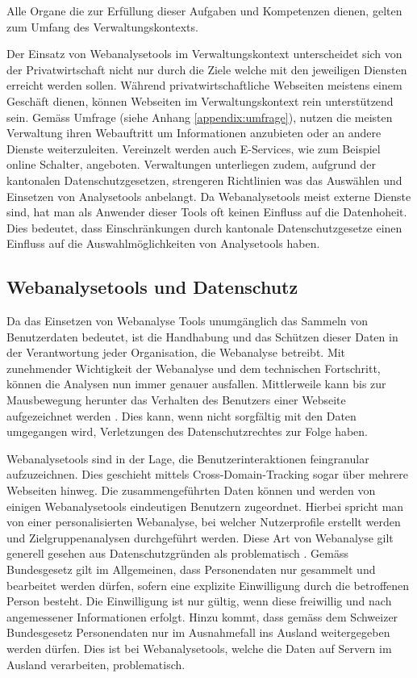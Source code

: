 Alle Organe die zur Erfüllung dieser Aufgaben und Kompetenzen dienen, gelten zum Umfang des Verwaltungskontexts.

Der Einsatz von Webanalysetools im Verwaltungskontext unterscheidet sich von der Privatwirtschaft nicht nur durch die Ziele welche mit den jeweiligen Diensten erreicht werden sollen. Während privatwirtschaftliche Webseiten meistens einem Geschäft dienen, können Webseiten im Verwaltungskontext rein unterstützend sein. Gemäss Umfrage (siehe Anhang \ref{appendix:umfrage}), nutzen die meisten Verwaltung ihren Webauftritt um Informationen anzubieten oder an andere Dienste weiterzuleiten. Vereinzelt werden auch E-Services, wie zum Beispiel online Schalter, angeboten. Verwaltungen unterliegen zudem, aufgrund der kantonalen Datenschutzgesetzen, strengeren Richtlinien was das Auswählen und Einsetzen von Analysetools anbelangt. Da Webanalysetools meist externe Dienste sind, hat man als Anwender dieser Tools oft keinen Einfluss auf die Datenhoheit. Dies bedeutet, dass Einschränkungen durch kantonale Datenschutzgesetze einen Einfluss auf die Auswahlmöglichkeiten von Analysetools haben.

\subsection{Webanalysetools und Datenschutz} \label{subsec:datenschutz}
Da das Einsetzen von Webanalyse Tools unumgänglich das Sammeln von Benutzerdaten bedeutet, ist die Handhabung und das Schützen dieser Daten in der Verantwortung jeder Organisation, die Webanalyse betreibt. Mit zunehmender Wichtigkeit der Webanalyse und dem technischen Fortschritt, können die Analysen nun immer genauer ausfallen. Mittlerweile kann bis zur Mausbewegung herunter das Verhalten des Benutzers einer Webseite aufgezeichnet werden \parencite[S. 1]{EcommerceUndDatenschutz}. Dies kann, wenn nicht sorgfältig mit den Daten umgegangen wird, Verletzungen des Datenschutzrechtes zur Folge haben.

Webanalysetools sind in der Lage, die Benutzerinteraktionen feingranular aufzuzeichnen. Dies geschieht mittels Cross-Domain-Tracking sogar über mehrere Webseiten hinweg. Die zusammengeführten Daten können und werden von einigen Webanalysetools eindeutigen Benutzern zugeordnet. Hierbei spricht man von einer personalisierten Webanalyse, bei welcher Nutzerprofile erstellt werden und Zielgruppenanalysen durchgeführt werden. Diese Art von Webanalyse gilt generell gesehen aus Datenschutzgründen als problematisch \parencite[S. 2]{EcommerceUndDatenschutz}. Gemäss Bundesgesetz \parencite[§§ 4 Abs. 5]{SDSG} gilt im Allgemeinen, dass Personendaten nur gesammelt und bearbeitet werden dürfen, sofern eine explizite Einwilligung durch die betroffenen Person besteht. Die Einwilligung ist nur gültig, wenn diese freiwillig und nach angemessener Informationen erfolgt. Hinzu kommt, dass gemäss dem Schweizer Bundesgesetz \parencite[§§ 6 Abs. 1]{SDSG} Personendaten nur im Ausnahmefall ins Ausland weitergegeben werden dürfen. Dies ist bei Webanalysetools, welche die Daten auf Servern im Ausland verarbeiten, problematisch.

